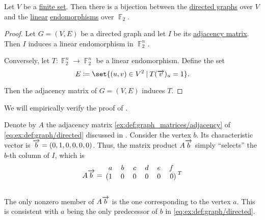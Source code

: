 \begin{proposition}\label{thm:graphs_as_linear_transformations}
  Let \( V \) be a \hyperref[def:set_finiteness]{finite set}. Then there is a bijection between the \hyperref[def:graph/directed]{directed graphs} over \( V \) and the \hyperref[def:linear_operator]{linear} \hyperref[def:endomorphism]{endomorphisms} over \( \BbbF_2 \).
\end{proposition}
\begin{proof}
  Let \( G = (V, E) \) be a directed graph and let \( I \) be its \hyperref[def:graph_matrices/adjacency]{adjacency matrix}. Then \( I \) induces a linear endomorphism in \( \BbbF_2^n \).

  Conversely, let \( T: \BbbF_2^n \to \BbbF_2^n \) be a linear endomorphism. Define the set
  \begin{equation*}
    E \coloneqq \set{ (u, v) \in V^2 \given T(\vect{v})_u = 1 }.
  \end{equation*}

  Then the adjacency matrix of \( G = (V, E) \) induces \( T \).
\end{proof}

\begin{example}\label{ex:thm:graphs_as_linear_transformations}
  We will empirically verify the proof of .

  Denote by \( A \) the adjacency matrix \eqref{ex:def:graph_matrices/adjacency} of \eqref{eq:ex:def:graph/directed} discussed in . Consider the vertex \( b \). Its characteristic vector is \( \overrightarrow{b} = (0, 1, 0, 0, 0, 0) \). Thus, the matrix product \( A \overrightarrow{b} \) simply \enquote{selects} the \( b \)-th column of \( I \), which is
  \begin{equation*}
    A \vect{b}
    =
    \begin{blockarray}{cccccrl}
      a        & b        & c        & d        & e        & f \\
    \begin{block}{(cccccr)l}
      1        & 0        & 0        & 0        & 0        & 0 \\
    \end{block}
    \end{blockarray}
    {}^T
  \end{equation*}

  The only nonzero member of \( A \overrightarrow{b} \) is the one corresponding to the vertex \( a \). This is consistent with \( a \) being the only predecessor of \( b \) in \eqref{eq:ex:def:graph/directed}.
\end{example}

